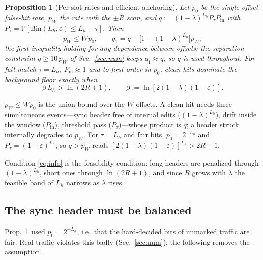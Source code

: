 \documentclass[journal]{IEEEtran}
\newcommand{\pbit}{\varepsilon}
\newcommand{\Lh}{L_h}
\newcommand{\Prob}{\mathbb{P}}
\newcommand{\Bin}{\mathrm{Bin}}
\newtheorem{proposition}{Proposition}
\begin{document}
\begin{proposition}[Per-slot rates and efficient anchoring]
\label{thm:hit}
Let $p_0$ be the single-offset false-hit rate, $p_W$ the rate with the $\pm R$ scan, and $q:=(1-\lambda)^{\Lh}P_\tau P_{\mathrm{in}}$ with $P_\tau=\Prob[\Bin(\Lh,\pbit)\le \Lh-\tau]$. Then
\begin{equation}
p_W\le W p_0,\qquad q_1=q+\big[1-(1-\lambda)^{\Lh}\big]p_W,
\label{eq:qp0}
\end{equation}
the first inequality holding for any dependence between offsets; the separation constraint $q\ge10\,p_W$ of Sec.~\ref{sec:num} keeps $q_1\approx q$, so $q$ is used throughout. For full match $\tau=\Lh$, $P_{\mathrm{in}}\approx1$ and to first order in $p_0$, clean hits dominate the background floor exactly when
\begin{equation}
\beta\,\Lh>\ln(2R+1),\qquad \beta:=\ln[2(1-\lambda)(1-\pbit)] .
\label{eq:info}
\end{equation}
\end{proposition}
\begin{IEEEproof}
$p_W\le Wp_0$ is the union bound over the $W$ offsets. A clean hit needs three simultaneous events---sync header free of internal edits ($(1-\lambda)^{\Lh}$), drift inside the window ($P_{\mathrm{in}}$), threshold pass ($P_\tau$)---whose product is $q$; a header struck internally degrades to $p_W$. For $\tau=\Lh$ and fair bits, $p_0=2^{-\Lh}$ and $P_\tau=(1-\pbit)^{\Lh}$, so $q>p_W$ reads $[2(1-\lambda)(1-\pbit)]^{\Lh}>2R+1$.
\end{IEEEproof}

Condition \eqref{eq:info} is the feasibility condition: long headers are penalized through $(1-\lambda)^{\Lh}$, short ones through $\ln(2R+1)$, and since $R$ grows with $\lambda$ the feasible band of $\Lh$ narrows as $\lambda$ rises.

\subsection{The sync header must be balanced}
Prop.~\ref{thm:hit} used $p_0=2^{-\Lh}$, i.e.\ that the hard-decided bits of unmarked traffic are fair. Real traffic violates this badly (Sec.~\ref{sec:num}); the following removes the assumption.
\end{document}
